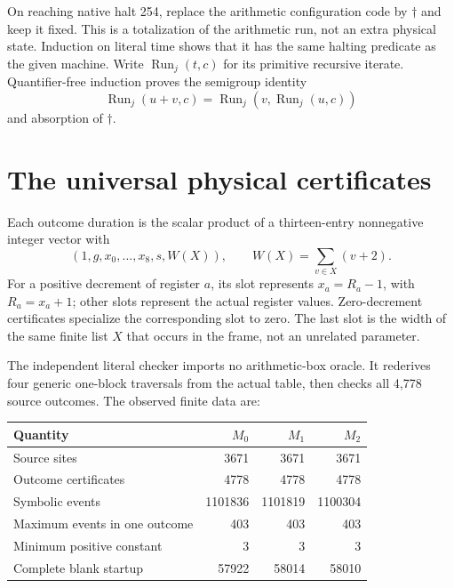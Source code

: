 \documentclass[11pt]{article}
\newcommand{\Run}{\operatorname{Run}}
\begin{document}
On reaching native halt 254, replace the arithmetic configuration code
by $\dagger$ and keep it fixed. This is a totalization of the arithmetic
run, not an extra physical state. Induction on literal time shows that it
has the same halting predicate as the given machine. Write
$\Run_j(t,c)$ for its primitive recursive iterate. Quantifier-free
induction proves the semigroup identity
\[
 \Run_j(u+v,c)=\Run_j(v,\Run_j(u,c))                       \tag{2}
\]
and absorption of $\dagger$.

\section{The universal physical certificates}

Each outcome duration is the scalar product of a thirteen-entry
nonnegative integer vector with
\[
 (1,g,x_0,\ldots,x_8,s,W(X)),\qquad
 W(X)=\sum_{v\in X}(v+2).                                \tag{3}
\]
For a positive decrement of register $a$, its slot represents
$x_a=R_a-1$, with $R_a=x_a+1$; other slots represent the actual
register values. Zero-decrement certificates specialize the corresponding
slot to zero. The last slot is the width of the same finite list $X$
that occurs in the frame, not an unrelated parameter.

The independent literal checker imports no arithmetic-box oracle. It
rederives four generic one-block traversals from the actual table, then
checks all 4,778 source outcomes. The observed finite data are:
\begin{center}
\begin{tabular}{lrrr}
\toprule
Quantity & $M_0$ & $M_1$ & $M_2$\\
\midrule
Source sites & 3671 & 3671 & 3671\\
Outcome certificates & 4778 & 4778 & 4778\\
Symbolic events & 1101836 & 1101819 & 1100304\\
Maximum events in one outcome & 403 & 403 & 403\\
Minimum positive constant & 3 & 3 & 3\\
Complete blank startup & 57922 & 58014 & 58010\\
\bottomrule
\end{tabular}
\end{center}
\end{document}
